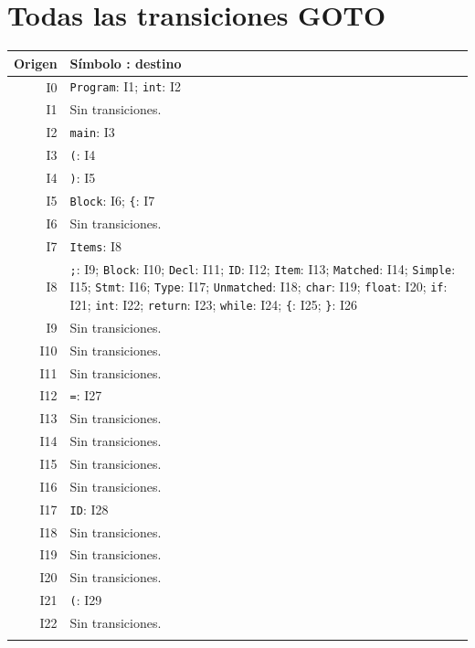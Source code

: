 \section*{Todas las transiciones GOTO}
{\small\begin{longtable}{@{}r p{14.7cm}@{}}\toprule Origen & Símbolo : destino\\\midrule\endhead
I0 & \texttt{Program}: I1; \texttt{int}: I2\\\addlinespace[3pt]
I1 & Sin transiciones.\\\addlinespace[3pt]
I2 & \texttt{main}: I3\\\addlinespace[3pt]
I3 & \texttt{(}: I4\\\addlinespace[3pt]
I4 & \texttt{)}: I5\\\addlinespace[3pt]
I5 & \texttt{Block}: I6; \texttt{\{}: I7\\\addlinespace[3pt]
I6 & Sin transiciones.\\\addlinespace[3pt]
I7 & \texttt{Items}: I8\\\addlinespace[3pt]
I8 & \texttt{;}: I9; \texttt{Block}: I10; \texttt{Decl}: I11; \texttt{ID}: I12; \texttt{Item}: I13; \texttt{Matched}: I14; \texttt{Simple}: I15; \texttt{Stmt}: I16; \texttt{Type}: I17; \texttt{Unmatched}: I18; \texttt{char}: I19; \texttt{float}: I20; \texttt{if}: I21; \texttt{int}: I22; \texttt{return}: I23; \texttt{while}: I24; \texttt{\{}: I25; \texttt{\}}: I26\\\addlinespace[3pt]
I9 & Sin transiciones.\\\addlinespace[3pt]
I10 & Sin transiciones.\\\addlinespace[3pt]
I11 & Sin transiciones.\\\addlinespace[3pt]
I12 & \texttt{=}: I27\\\addlinespace[3pt]
I13 & Sin transiciones.\\\addlinespace[3pt]
I14 & Sin transiciones.\\\addlinespace[3pt]
I15 & Sin transiciones.\\\addlinespace[3pt]
I16 & Sin transiciones.\\\addlinespace[3pt]
I17 & \texttt{ID}: I28\\\addlinespace[3pt]
I18 & Sin transiciones.\\\addlinespace[3pt]
I19 & Sin transiciones.\\\addlinespace[3pt]
I20 & Sin transiciones.\\\addlinespace[3pt]
I21 & \texttt{(}: I29\\\addlinespace[3pt]
I22 & Sin transiciones.\\\addlinespace[3pt]

\end{longtable}}
